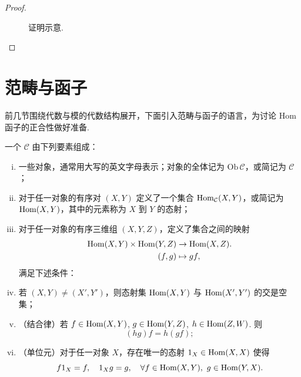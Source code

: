\begin{proof}
\begin{figure}[H]
\begin{subfigure}[b]{0.28\linewidth}
        \end{subfigure}
        \hspace{0.05\linewidth}
        \begin{subfigure}[b]{0.28\linewidth}
            \centering
        \end{subfigure}
        \caption{证明示意.}
    \end{figure}
\end{proof}

\section{范畴与函子}

前几节围绕代数与模的代数结构展开，下面引入范畴与函子的语言，为讨论 Hom 函子的正合性做好准备.

\begin{definition}[范畴]\label{def:category}
    一个 $\mathcal{C}$ 由下列要素组成：
    \begin{enumerate}[(i)]
        \item 一些对象，通常用大写的英文字母表示；对象的全体记为 $\mathrm{Ob}\,\mathcal{C}$，或简记为 $\mathcal{C}$；
        \item 对于任一对象的有序对 $(X,Y)$ 定义了一个集合 $\operatorname{Hom}_{\mathcal{C}}(X,Y)$，或简记为 $\operatorname{Hom}(X,Y)$，其中的元素称为 $X$ 到 $Y$ 的态射；
        \item 对于任一对象的有序三维组 $(X,Y,Z)$，定义了集合之间的映射
        \begin{align*}
            \operatorname{Hom}(X,Y) \times \operatorname{Hom}(Y,Z) &\to \operatorname{Hom}(X,Z).\\
            (f,g) &\mapsto gf,
        \end{align*}
        满足下述条件：
        \item[(\textrm{i}')] 若 $(X,Y) \neq (X',Y')$，则态射集 $\operatorname{Hom}(X,Y)$ 与 $\operatorname{Hom}(X',Y')$ 的交是空集；
        \item[(\textrm{ii}')] （结合律）若 $f \in \operatorname{Hom}(X,Y)$, $g \in \operatorname{Hom}(Y,Z)$, $h \in \operatorname{Hom}(Z,W)$. 则
        \[
        (hg)f = h(gf);
        \]
        \item[(\textrm{iii}')] （单位元）对于任一对象 $X$，存在唯一的态射 $1_X \in \operatorname{Hom}(X,X)$ 使得
        \[
        f 1_X = f,\quad 1_X g = g,\quad \forall f \in \operatorname{Hom}(X,Y),\ g \in \operatorname{Hom}(Y,X).
        \]
    \end{enumerate}
\end{definition}

